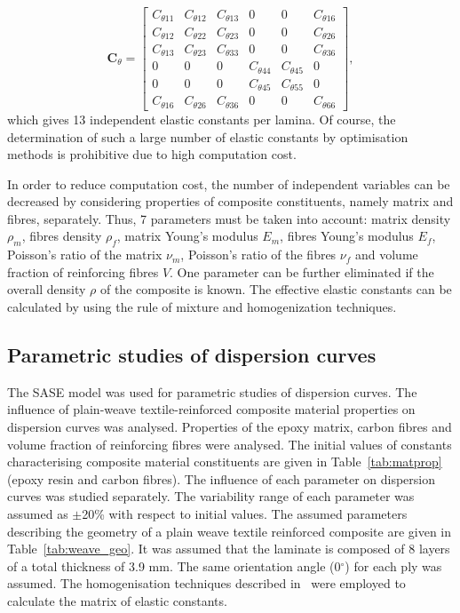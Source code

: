 \documentclass[preprint,12pt]{elsarticle}
\newcommand{\matr}[1]{\mathbf{#1}} %
\begin{document}
 \begin{equation}
 \matr{C}_{\theta} = \left[\begin{array}{cccccc} C_{\theta 11} & C_{\theta 12}& 
 C_{\theta 13} & 
0&0&C_{\theta 16}\\[2pt]
 C_{\theta 12}& C_{\theta 22} & C_{\theta 23}& 0 &0&C_{\theta 26}\\[2pt]
 C_{\theta 13}&C_{\theta 23}&C_{\theta 33}&0&0&C_{\theta 36}\\[2pt]
 0& 0&0&C_{\theta 44}& C_{\theta 45}&0\\[2pt]
 0&0&0&C_{\theta 45}&C_{\theta 55}&0\\[2pt]
 C_{\theta 16}&C_{\theta 26} &C_{\theta 36}&0&0&C_{\theta 66}
 \end{array}\right], 
 \label{eq:elastic_constatns_theta}
 \end{equation} 
 which gives 13 independent elastic constants per lamina. Of course, the determination 
 of such a large 
number of elastic constants by optimisation methods is prohibitive due to high 
computation cost. 
 
 In order to reduce computation cost, the number of independent variables can be 
 decreased by considering properties of composite constituents, namely matrix and 
 fibres, separately. Thus,  7 parameters must be taken into account: matrix density 
 \(\rho_m\), fibres density \(\rho_f\), matrix Young's modulus \(E_m\), fibres Young's 
 modulus \(E_f\), Poisson's ratio of the matrix \(\nu_m\), Poisson's ratio of the fibres 
 \(\nu_f\) and volume fraction of reinforcing fibres \(V\). One parameter can be further 
 eliminated if the overall density \(\rho\) of the composite is known. The effective elastic 
 constants can be calculated by using the rule of mixture and homogenization 
 techniques.
 \subsection{Parametric studies of dispersion curves \label{sec:parametric}}
 The SASE model was used for parametric studies of dispersion curves. The influence 
 of plain-weave textile-reinforced composite material properties on dispersion curves 
 was analysed. Properties of the epoxy matrix, carbon fibres and volume fraction of 
 reinforcing fibres were analysed. The initial values of constants characterising 
 composite material constituents are given in Table~\ref{tab:matprop} (epoxy resin and 
 carbon fibres). The influence of each parameter on dispersion curves was studied 
 separately. The variability range of each parameter was assumed as \(\pm\)20\% with 
 respect to initial values. The assumed parameters describing the geometry of a plain 
 weave textile reinforced composite are given in Table~\ref{tab:weave_geo}. It was 
 assumed that the laminate is composed of 8 layers of a total thickness of 3.9 mm. The 
 same orientation angle (0\(^{\circ}\)) for each ply was assumed. The homogenisation 
 techniques described in~\cite{Barbero2006,Adumitroaie2012} were employed to 
 calculate the matrix of elastic constants.
 
\end{document}
